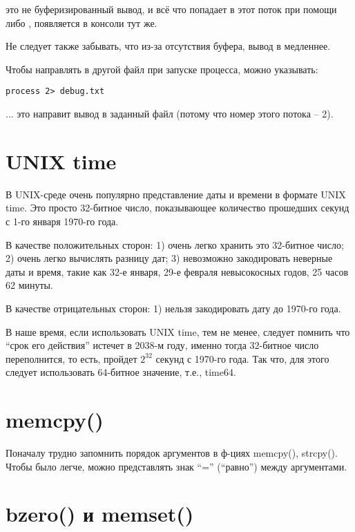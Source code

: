  это не буферизированный вывод, и всё что попадает в этот поток при помощи 
 либо , появляется в консоли тут же.

Не следует также забывать, что из-за отсутствия буфера, вывод в  медленнее.

Чтобы направлять  в другой файл при запуске процесса, можно указывать:

\begin{lstlisting}
process 2> debug.txt
\end{lstlisting}

... это направит вывод  в заданный файл (потому что номер этого потока -- 2).

\section{UNIX time}

В UNIX-среде очень популярно представление даты и времени в формате UNIX time.
Это просто 32-битное число, показывающее
количество прошедших секунд с 1-го января 1970-го года.

В качестве положительных сторон: 1) очень легко хранить это 32-битное число; 2) очень легко вычислять разницу дат;
3) невозможно закодировать неверные даты и время, такие как 32-е января, 29-е февраля невысокосных годов, 
25 часов 62 минуты.

В качестве отрицательных сторон: 1) нельзя закодировать дату до 1970-го года.

В наше время, если использовать UNIX time, тем не менее, следует помнить что ``срок его действия'' истечет
в 2038-м году, именно тогда 32-битное число переполнится, то есть, пройдет $2^{32}$ секунд с 1970-го года.
Так что, для этого следует использовать 64-битное значение, т.е., time64.




\label{memcpy}
\section{memcpy()}

Поначалу трудно запомнить порядок аргументов в ф-циях memcpy(), strcpy(). Чтобы было легче, можно представлять
знак ``='' (``равно'') между аргументами.

\label{bzero}
\section{bzero() и memset()}

